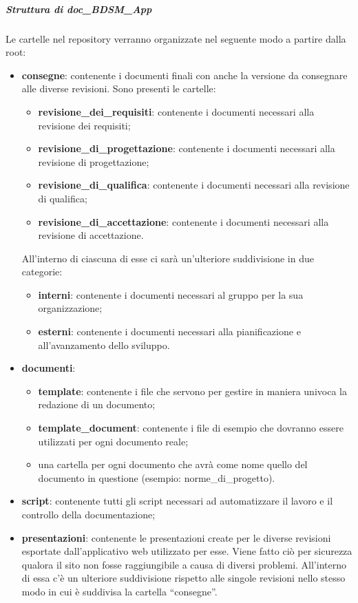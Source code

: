 				\subparagraph{Struttura di doc\_BDSM\_App}
				Le cartelle nel repository verranno organizzate nel seguente modo a partire dalla root:
					\begin{itemize}
						\item \textbf{consegne}: contenente i documenti finali con anche la versione da consegnare alle diverse revisioni. Sono presenti le cartelle:
							\begin{itemize}
								\item \textbf{revisione\_dei\_requisiti}: contenente i documenti necessari alla revisione dei requisiti;
								\item \textbf{revisione\_di\_progettazione}: contenente i documenti necessari alla revisione di progettazione;
								\item \textbf{revisione\_di\_qualifica}: contenente i documenti necessari alla revisione di qualifica;
								\item \textbf{revisione\_di\_accettazione}: contenente i documenti necessari alla revisione di accettazione.
							\end{itemize}
						\noindent
						All'interno di ciascuna di esse ci sarà un'ulteriore suddivisione in due categorie:
							\begin{itemize}
								\item \textbf{interni}: contenente i documenti necessari al gruppo per la sua organizzazione;
								\item \textbf{esterni}: contenente i documenti necessari alla pianificazione e all'avanzamento dello sviluppo.
							\end{itemize}
							
						\item \textbf{documenti}:
							\begin{itemize}
								\item \textbf{template}: contenente i file che servono per gestire in maniera univoca la redazione di un documento;
								\item \textbf{template\_document}: contenente i file di esempio che dovranno essere utilizzati per ogni documento reale;
								\item una cartella per ogni documento che avrà come nome quello del documento in questione (esempio: norme\_di\_progetto).
							\end{itemize}
							
						\item \textbf{script}: contenente tutti gli script necessari ad automatizzare il lavoro e il controllo della documentazione;
						\item \textbf{presentazioni}: contenente le presentazioni create per le diverse revisioni esportate dall'applicativo web utilizzato per esse. Viene fatto ciò per sicurezza qualora il sito non fosse raggiungibile a causa di diversi problemi. All'interno di essa c'è un ulteriore suddivisione rispetto alle singole revisioni nello stesso modo in cui è suddivisa la cartella ``consegne''.
					\end{itemize}

